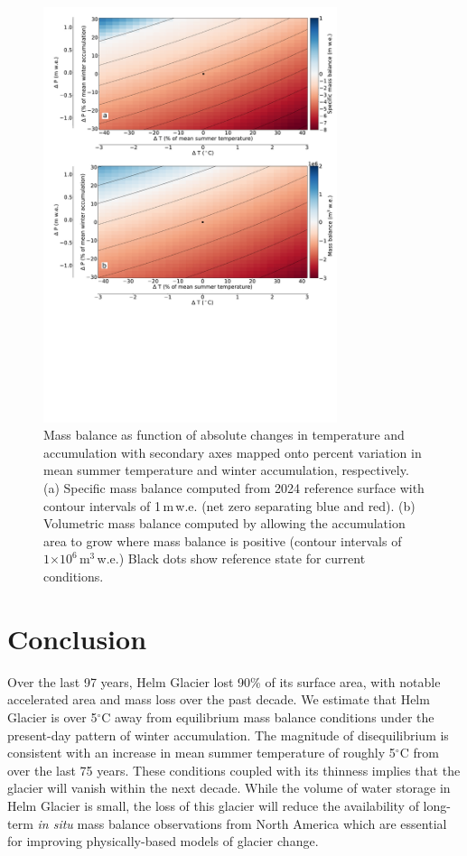 \documentclass[annals,review,oneside]{igs}
\begin{document}
\begin{figure}[H]
\centering
\includegraphics[width=86mm,trim=0cm 7cm 0cm 0cm, clip=true]
{SMB_S.pdf}
\caption{Mass balance as function of absolute changes in temperature and accumulation with secondary axes mapped onto percent variation in mean summer temperature and winter accumulation, respectively. (a) Specific mass balance computed from 2024 reference surface with contour intervals of 1\,m\,w.e. (net zero separating blue and red). (b) Volumetric mass balance computed by allowing the accumulation area to grow where mass balance is positive (contour intervals of $1 \mathrm{\times 10^6\,m^3}$\,w.e.) Black dots show reference state for current conditions.}
\label{SMB}
\end{figure}


\section{Conclusion}

Over the last 97 years, Helm Glacier lost 90\% of its surface area, with notable accelerated area and mass loss over the past decade. We estimate that Helm Glacier is over 5$^\circ$C away from equilibrium mass balance conditions under the present-day pattern of winter accumulation. The magnitude of disequilibrium is consistent with an increase in mean summer temperature of roughly 5$^\circ$C from over the last 75 years. These conditions coupled with its thinness implies that the glacier will vanish within the next decade. While the volume of water storage in Helm Glacier is small, the loss of this glacier will reduce the availability of long-term  \emph{in situ} mass balance observations from North America which are essential for improving physically-based models of glacier change.
\end{document}
